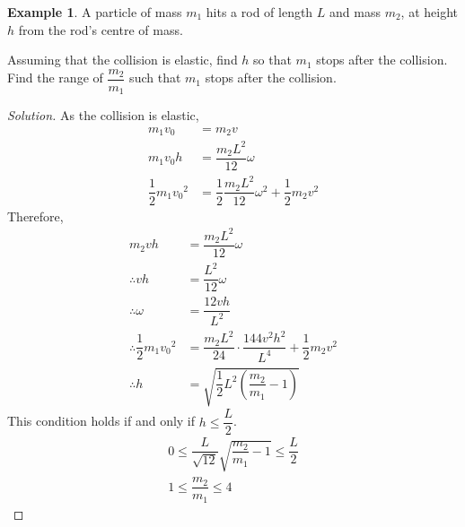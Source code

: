 \documentclass[fleqn, a4paper, 12pt]{amsart}
\theoremstyle{definition}
\newtheorem{example}{Example}
\theoremstyle{theorem}
\newenvironment{solution}
{\begin{proof}[Solution]\let\qed\relax}
	{\end{proof}}
\begin{document}
\begin{example}
	A particle of mass $m_1$ hits a rod of length $L$ and mass $m_2$, at height $h$ from the rod's centre of mass.\\
	\begin{figure}[H]
	\end{figure}
	Assuming that the collision is elastic, find $h$ so that $m_1$ stops after the collision. Find the range of $\dfrac{m_2}{m_1}$ such that $m_1$ stops after the collision.
\end{example}

\begin{solution}
	As the collision is elastic,
	\begin{align*}
		m_1 v_0 &= m_2 v\\
		m_1 v_0 h &= \dfrac{m_2 L^2}{12} \omega\\
		\dfrac{1}{2} m_1 {v_0}^2 &= \dfrac{1}{2} \dfrac{m_2 L^2}{12} \omega^2 + \dfrac{1}{2} m_2 v^2
	\end{align*}
	Therefore,
	\begin{align*}
		m_2 v h &= \dfrac{m_2 L^2}{12} \omega\\
		\therefore v h &= \dfrac{L^2}{12} \omega\\
		\therefore \omega &= \dfrac{12 v h}{L^2}\\
		\therefore \dfrac{1}{2} m_1 {v_0}^2 &= \dfrac{m_2 L^2}{24} \cdot \dfrac{144 v^2 h^2}{L^4} + \dfrac{1}{2} m_2 v^2\\
		\therefore h &= \sqrt{\dfrac{1}{2} L^2 \left( \dfrac{m_2}{m_1} - 1 \right)}
	\end{align*}
	This condition holds if and only if $h \leq \dfrac{L}{2}$.
	\begin{align*}
		0 \leq \dfrac{L}{\sqrt{12}} \sqrt{\dfrac{m_2}{m_1} - 1} \leq \dfrac{L}{2}\\
		1 \leq \dfrac{m_2}{m_1} \leq 4
	\end{align*}
\end{solution}
\end{document}
